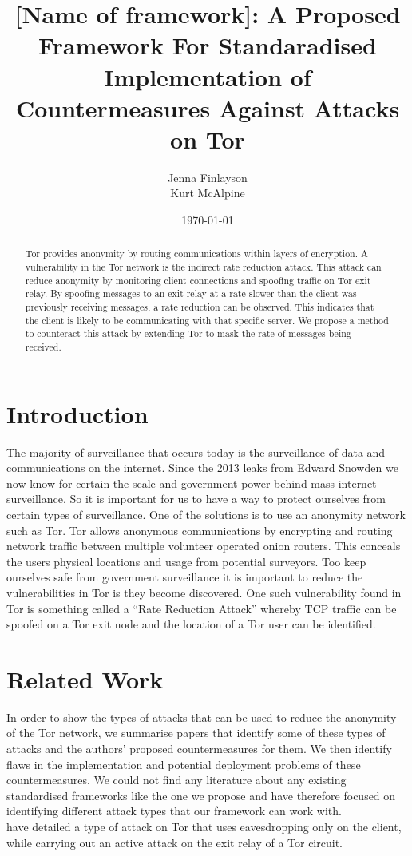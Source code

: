 \documentclass[9pt,technote]{IEEEtran}
\title{[Name of framework]: A Proposed Framework For Standaradised Implementation of Countermeasures Against Attacks on Tor}
\date{\today}
\author{Jenna Finlayson\\Kurt McAlpine}
\begin{document}
\maketitle

\begin{abstract}
Tor provides anonymity by routing communications within layers of encryption. A
vulnerability in the Tor network is the indirect rate reduction attack. This
attack can reduce anonymity by monitoring client connections and spoofing
traffic on Tor exit relay. By spoofing messages to an exit relay at a rate
slower than the client was previously receiving messages, a rate reduction can
be observed. This indicates that the client is likely to be communicating with
that specific server. We propose a method to counteract this attack by
extending Tor to mask the rate of messages being received.
\end{abstract}

\section{Introduction}

The majority of surveillance that occurs today is the surveillance of data and
communications on the internet\cite{diffie2008brave}. Since the 2013 leaks from
Edward Snowden we now know for certain the scale and government power behind
mass internet surveillance. So it is important for us to have a way to protect
ourselves from certain types of surveillance. One of the solutions is to use an
anonymity network such as Tor. Tor allows anonymous communications by
encrypting and routing network traffic between multiple volunteer operated
onion routers. This conceals the users physical locations and usage from
potential surveyors. Too keep ourselves safe from government surveillance it is
important to reduce the vulnerabilities in Tor is they become discovered. One
such vulnerability found in Tor is something called a ``Rate Reduction Attack''
whereby TCP traffic can be spoofed on a Tor exit node and the location of a Tor
user can be identified\cite{gilad2012spying}.

\cite{hayesguard}\cite{gilad2012spying}\cite{sun2015raptor}\cite{biryukov2012torscan}\cite{jansen2014sniper}\cite{tor}

\section{Related Work}
In order to show the types of attacks that can be used to reduce the anonymity of the Tor network, we summarise papers that identify some of these types of attacks and the authors' proposed countermeasures for them. We then identify flaws in the implementation and potential deployment problems of these countermeasures. We could not find any literature about any existing standardised frameworks like the one we propose and have therefore focused on identifying different attack types that our framework can work with.\\

\citeauthor{gilad2012spying} have detailed a type of attack on Tor that uses eavesdropping only on the client, while carrying out an active attack on the exit relay of a Tor circuit.




\end{document}
